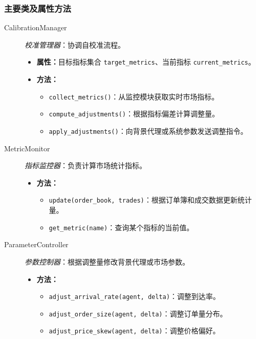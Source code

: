 \subsubsection{主要类及属性方法}
\begin{description}
  \item[CalibrationManager] \emph{校准管理器}：协调自校准流程。
  \begin{itemize}
    \item \textbf{属性：}目标指标集合 \verb|target_metrics|、当前指标 \verb|current_metrics|。
    \item \textbf{方法：}
      \begin{itemize}
        \item \verb|collect_metrics()|：从监控模块获取实时市场指标。
        \item \verb|compute_adjustments()|：根据指标偏差计算调整量。
        \item \verb|apply_adjustments()|：向背景代理或系统参数发送调整指令。
      \end{itemize}
  \end{itemize}
  \item[MetricMonitor] \emph{指标监控器}：负责计算市场统计指标。
  \begin{itemize}
    \item \textbf{方法：}
      \begin{itemize}
        \item \verb|update(order_book, trades)|：根据订单簿和成交数据更新统计量。
        \item \verb|get_metric(name)|：查询某个指标的当前值。
      \end{itemize}
  \end{itemize}
  \item[ParameterController] \emph{参数控制器}：根据调整量修改背景代理或市场参数。
  \begin{itemize}
    \item \textbf{方法：}
      \begin{itemize}
        \item \verb|adjust_arrival_rate(agent, delta)|：调整到达率。
        \item \verb|adjust_order_size(agent, delta)|：调整订单量分布。
        \item \verb|adjust_price_skew(agent, delta)|：调整价格偏好。
      \end{itemize}
  \end{itemize}
\end{description}

